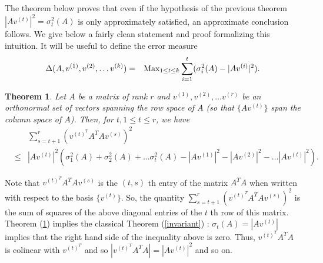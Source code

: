 \documentclass{book}
\newtheorem{theorem}{Theorem}[chapter]
\numberwithin{exercise}{chapter}
\begin{document}
The theorem below proves that even if the hypothesis of the previous theorem
$ |Av^{(t)}|^2= \sigma_t^2(A)$ is only approximately satisfied, an
approximate conclusion follows.
We give below a fairly clean statement and proof formalizing this intuition.
It will be useful to define the error measure
\begin{eqnarray}
\Delta(A,v^{(1)},v^{(2)},\ldots v^{(k)})&=&\hbox{Max}_{1 \le t \le k} \sum_{i=1}^t(\sigma_i^2(A) -|Av^{(i)}|^2)\label{7000}.
\end{eqnarray}

\begin{theorem} \label{invariant2}
Let $A$ be a matrix of rank $r$ and $v^{(1)},v^{(2)},\ldots v^{(r)}$ be an
orthonormal set of vectors spanning the row space of $A$ (so that $\{ Av^{(t)}\}$ span the column space of $A$). Then, for $t,1\leq t\leq r$, we have
\begin{eqnarray*}
&&\sum_{s=t+1}^r \left( v^{(t)^T}A^TAv^{(s)}\right)^2\\
&\leq &
|Av^{(t)}|^2\left(\sigma_1^2(A)+\sigma_2^2(A)+\ldots \sigma_t^2(A)-|Av^{(1)}|^2-|Av^{(2)}|^2-\ldots |Av^{(t)}|^2\right).
\end{eqnarray*}
\end{theorem}
 Note that $v^{(t)^T}A^TAv^{(s)}$ is the $(t,s)$ th entry of the matrix $A^TA$ when written with respect
 to the basis $\{ v^{(t)}\}$. So,
 the quantity $\sum_{s=t+1}^r \left( v^{(t)^T}A^TAv^{(s)}\right)^2$ is the sum of
 squares of the above diagonal entries of the $t$ th row of this matrix.
 Theorem (\ref{invariant2}) implies the classical Theorem (\ref{invariant}) : $\sigma_t(A)=|Av^{(t)}|$
 implies that the right hand side of the inequality above is zero. Thus,
 $v^{(t)^T}A^TA$ is colinear with $v^{(t)^T}$ and so $|v^{(t)^T}A^TA|=|Av^{(t)}|^2$ and so on.
\end{document}
